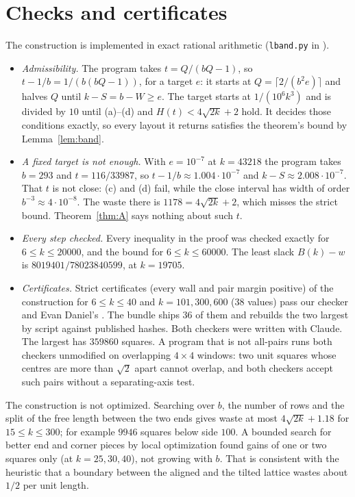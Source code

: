 \documentclass[11pt,letterpaper]{amsart}
\theoremstyle{plain}
\theoremstyle{remark}
\begin{document}
\section{Checks and certificates}

The construction is implemented in exact rational arithmetic (\texttt{lband.py} in \cite{Fan26b}).
\begin{itemize}
\item \emph{Admissibility.} The program takes $t=Q/(bQ-1)$, so $t-1/b=1/(b(bQ-1))$, for a target $e$: it starts at $Q=\lceil2/(b^2e)\rceil$ and halves $Q$ until $k-S=b-W\ge e$. The target starts at $1/(10^6k^3)$ and is divided by $10$ until (a)--(d) and $H(t)<4\sqrt{2k}+2$ hold. It decides those conditions exactly, so every layout it returns satisfies the theorem's bound by Lemma~\ref{lem:band}.
\item \emph{A fixed target is not enough.} With $e=10^{-7}$ at $k=43218$ the program takes $b=293$ and $t=116/33987$, so $t-1/b\approx1.004\cdot10^{-7}$ and $k-S\approx2.008\cdot10^{-7}$. That $t$ is not close: (c) and (d) fail, while the close interval has width of order $b^{-3}\approx4\cdot10^{-8}$. The waste there is $1178=4\sqrt{2k}+2$, which misses the strict bound. Theorem~\ref{thm:A} says nothing about such $t$.
\item \emph{Every step checked.} Every inequality in the proof was checked exactly for $6\le k\le20000$, and the bound for $6\le k\le60000$. The least slack $B(k)-w$ is $8019401/78023840599$, at $k=19705$.
\item \emph{Certificates.} Strict certificates (every wall and pair margin positive) of the construction for $6\le k\le40$ and $k=101,300,600$ ($38$ values) pass our checker and Evan Daniel's \cite{Dan26}. The bundle ships $36$ of them and rebuilds the two largest by script against published hashes. Both checkers were written with Claude. The largest has $359860$ squares. A program that is not all-pairs runs both checkers unmodified on overlapping $4\times4$ windows: two unit squares whose centres are more than $\sqrt2$ apart cannot overlap, and both checkers accept such pairs without a separating-axis test.
\end{itemize}

The construction is not optimized. Searching over $b$, the number of rows and the split of the free length between the two ends gives waste at most $4\sqrt{2k}+1.18$ for $15\le k\le300$; for example $9946$ squares below side $100$. A bounded search for better end and corner pieces by local optimization found gains of one or two squares only (at $k=25,30,40$), not growing with $b$. That is consistent with the heuristic that a boundary between the aligned and the tilted lattice wastes about $1/2$ per unit length.
\end{document}
